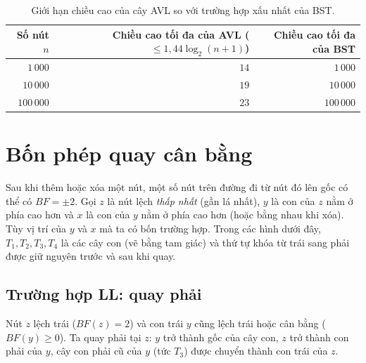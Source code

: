 \begin{table}[htbp]
\centering
\begin{tabular}{|r|r|r|}
\hline
Số nút $n$ & Chiều cao tối đa của AVL ($\le 1{,}44\log_2(n+1)$) & Chiều cao tối đa của BST \\
\hline
$1\,000$   & $14$  & $1\,000$ \\
$10\,000$  & $19$  & $10\,000$ \\
$100\,000$ & $23$  & $100\,000$ \\
\hline
\end{tabular}
\caption{Giới hạn chiều cao của cây AVL so với trường hợp xấu nhất của BST.}
\label{tab:chieucao}
\end{table}

\section{Bốn phép quay cân bằng}\label{sec:avl-quay}

Sau khi thêm hoặc xóa một nút, một số nút trên đường đi từ nút đó lên gốc có thể
có $BF = \pm 2$. Gọi $z$ là nút lệch \emph{thấp nhất} (gần lá nhất), $y$ là con
của $z$ nằm ở phía cao hơn và $x$ là con của $y$ nằm ở phía cao hơn (hoặc bằng
nhau khi xóa). Tùy vị trí của $y$ và $x$ mà ta có bốn trường hợp. Trong các hình
dưới đây, $T_1, T_2, T_3, T_4$ là các cây con (vẽ bằng tam giác) và thứ tự khóa
từ trái sang phải được giữ nguyên trước và sau khi quay.

\subsection{Trường hợp LL: quay phải}

Nút $z$ lệch trái ($BF(z) = 2$) và con trái $y$ cũng lệch trái hoặc cân bằng
($BF(y) \ge 0$). Ta quay phải tại $z$: $y$ trở thành gốc của cây con, $z$ trở
thành con phải của $y$, cây con phải cũ của $y$ (tức $T_3$) được chuyển thành con
trái của $z$.

